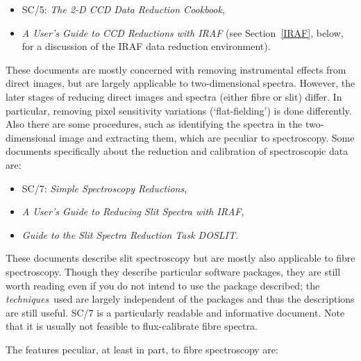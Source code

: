 \documentclass[twoside,11pt]{article}
\newcommand{\xref}[3]{#1}
\begin{document}
\begin{itemize}

  \item SC/5: {\it The 2-D CCD Data Reduction Cookbook}\/\cite{SC5},

  \item {\it A User's Guide to CCD Reductions with IRAF}\/\cite{MASSEY97}
   (see Section~\ref{IRAF}, below, for a discussion of the IRAF data
   reduction environment).

\end{itemize}

These documents are mostly concerned with removing instrumental effects
from direct images, but are largely applicable to two-dimensional
spectra.  However, the later stages of reducing direct images and
spectra (either fibre or slit) differ.  In particular, removing pixel
sensitivity variations (`flat-fielding') is done differently.  Also
there are some procedures, such as identifying the spectra in the
two-dimensional image and extracting them, which are peculiar to
spectroscopy.  Some documents specifically about the reduction and
calibration of spectroscopic data are:

\begin{itemize}

  \item \xref{SC/7}{sc7}{}: {\it Simple Spectroscopy
   Reductions}\/\cite{SC7},

  \item {\it A User's Guide to Reducing Slit Spectra with
   IRAF}\/\cite{MASSEY92},

  \item {\it Guide to the Slit Spectra Reduction Task
   DOSLIT}\/\cite{VALDES92B}.

\end{itemize}

These documents describe slit spectroscopy but are mostly also
applicable to fibre spectroscopy.  Though they describe particular
software packages, they are still worth reading even if you do not
intend to use the package described; the {\it techniques}\, used are
largely independent of the packages and thus the descriptions are still
useful.  \xref{SC/7}{sc7}{} is a particularly readable and informative
document.  Note that it is usually not feasible to flux-calibrate
fibre spectra.

The features peculiar, at least in part, to fibre spectroscopy are:
\end{document}
